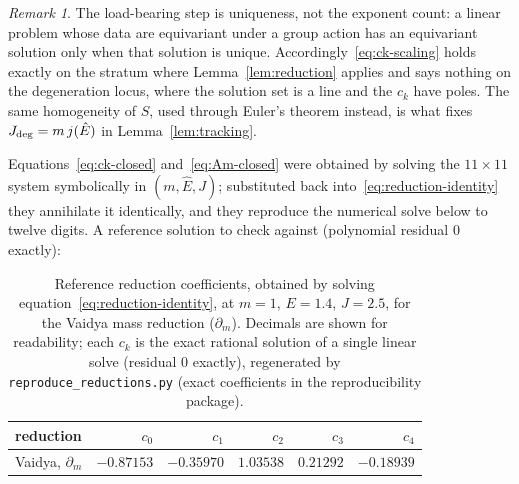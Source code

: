 \documentclass[12pt]{iopart}
\newcommand{\Ehat}{\hat E}
\newcommand{\Jc}{J_{\rm deg}}
\theoremstyle{plain}
\theoremstyle{definition}
\theoremstyle{plain}
\theoremstyle{remark}
\newtheorem*{remark}{Remark}
\begin{document}
\begin{remark}
The load-bearing step is uniqueness, not the exponent count: a linear problem whose data
are equivariant under a group action has an equivariant solution only when that solution
is unique. Accordingly~\eqref{eq:ck-scaling} holds exactly on the stratum where
Lemma~\ref{lem:reduction} applies and says nothing on the degeneration locus, where the
solution set is a line and the $c_k$ have poles. The same homogeneity of $S$, used through
Euler's theorem instead, is what fixes $\Jc=m\,j(\Ehat)$ in Lemma~\ref{lem:tracking}.
\end{remark}

Equations~\eqref{eq:ck-closed} and~\eqref{eq:Am-closed} were obtained by solving the
$11\times11$ system symbolically in $(m,\Ehat,J)$; substituted back
into~\eqref{eq:reduction-identity} they annihilate it identically, and they reproduce the
numerical solve below to twelve digits.
A reference solution to check against (polynomial residual $0$ exactly):
\begin{table}[htbp]
    \centering
    \caption{Reference reduction coefficients, obtained by solving
    equation~\eqref{eq:reduction-identity}, at $m{=}1$, $E{=}1.4$, $J{=}2.5$, for the Vaidya
    mass reduction ($\partial_m$). Decimals are shown for readability; each $c_k$ is the
    exact rational solution of a single linear solve (residual $0$ exactly), regenerated
    by \texttt{reproduce\_reductions.py} (exact coefficients in the reproducibility
    package).}
    \label{tab:reduction-ck}
    \small
    \begin{tabular}{lrrrrr}
        \hline\hline
        reduction & $c_0$ & $c_1$ & $c_2$ & $c_3$ & $c_4$\\
        \hline
        Vaidya, $\partial_m$ & $-0.87153$ & $-0.35970$ & $1.03538$ & $0.21292$ & $-0.18939$\\
        \hline\hline
    \end{tabular}
\end{table}
\end{document}
